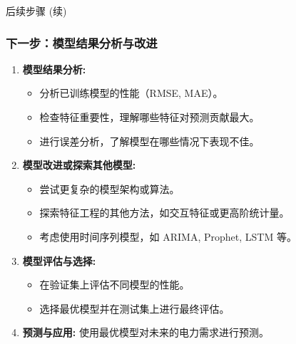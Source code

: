 \documentclass{beamer} %
\begin{document}
\begin{frame}{后续步骤 (续)}
    \frametitle{下一步：模型结果分析与改进}
    \begin{enumerate}
        \item \textbf{模型结果分析:}
        \begin{itemize}
            \item 分析已训练模型的性能（RMSE, MAE）。
            \item 检查特征重要性，理解哪些特征对预测贡献最大。
            \item 进行误差分析，了解模型在哪些情况下表现不佳。
        \end{itemize}
        \item \textbf{模型改进或探索其他模型:}
        \begin{itemize}
            \item 尝试更复杂的模型架构或算法。
            \item 探索特征工程的其他方法，如交互特征或更高阶统计量。
            \item 考虑使用时间序列模型，如 ARIMA, Prophet, LSTM 等。
        \end{itemize}
        \item \textbf{模型评估与选择:}
        \begin{itemize}
            \item 在验证集上评估不同模型的性能。
            \item 选择最优模型并在测试集上进行最终评估。
        \end{itemize}
        \item \textbf{预测与应用:} 使用最优模型对未来的电力需求进行预测。
    \end{enumerate}
\end{frame}
\end{document}
